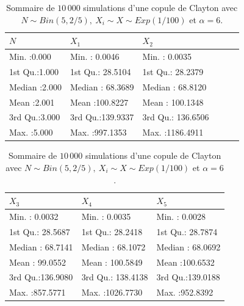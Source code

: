 \documentclass{article}
\begin{document}
	\begin{table}[H]
		\centering
		\begin{tabular}[width=\textwidth]{llllll}
			\hline
			       $N$ &       $X_1$ &       $X_2$ &             \\ 
			\hline
			Min.   :0.000   & Min.   :  0.0046   & Min.   :   0.0035      \\ 
			1st Qu.:1.000   & 1st Qu.: 28.5104   & 1st Qu.:  28.2379      \\ 
			Median :2.000   & Median : 68.3689   & Median :  68.8120      \\ 
			Mean   :2.001   & Mean   :100.8227   & Mean   : 100.1348      \\ 
			3rd Qu.:3.000   & 3rd Qu.:139.9337   & 3rd Qu.: 136.6506      \\ 
			Max.   :5.000   & Max.   :997.1353   & Max.   :1186.4911      \\ 
			\hline
		\end{tabular}
		\begin{tabular}[width=\textwidth]{lll}
			\hline
			       $X_3$ &       $X_4$ &       $X_5$ \\ 
			\hline
			 Min.   :  0.0032   & Min.   :   0.0035   & Min.   :  0.0028   \\ 
			 1st Qu.: 28.5687   & 1st Qu.:  28.2418   & 1st Qu.: 28.7874   \\ 
			 Median : 68.7141   & Median :  68.1072   & Median : 68.0692   \\ 
			 Mean   : 99.0552   & Mean   : 100.5849   & Mean   :100.6532   \\ 
			 3rd Qu.:136.9080   & 3rd Qu.: 138.4138   & 3rd Qu.:139.0188   \\ 
			 Max.   :857.5771   & Max.   :1026.7730   & Max.   :952.8392   \\ 
			\hline
		\end{tabular}
	\caption[Sommaire des données simulées pour une copule de Clayton avec une loi de fréquence binomiale.]{Sommaire de $10\,000$ simulations d'une copule de Clayton avec $N \sim Bin(5, 2/5),\ X_i \sim X \sim Exp(1/100)$ et $\alpha = 6$.}
	\label{tbl_sommaire_Clayton_Binom}
	\end{table}
\end{document}
